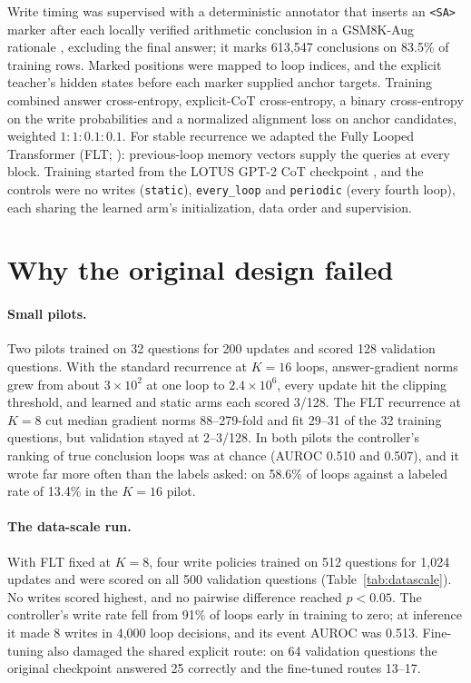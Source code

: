 \documentclass[11pt]{article}
\newcommand{\pol}[1]{\texttt{#1}}
\begin{document}
Write timing was supervised with a deterministic annotator that inserts an \texttt{<SA>} marker after each locally verified
arithmetic conclusion in a GSM8K-Aug rationale \citep{deng2023implicit}, excluding the final answer; it marks 613,547
conclusions on 83.5\% of training rows. Marked positions were mapped to loop indices, and the explicit teacher's hidden states
before each marker supplied anchor targets. Training combined answer cross-entropy, explicit-CoT cross-entropy, a binary
cross-entropy on the write probabilities and a normalized alignment loss on anchor candidates, weighted $1 : 1 : 0.1 : 0.1$.
For stable recurrence we adapted the Fully Looped Transformer (FLT; \citealp{fu2026flt}): previous-loop memory vectors supply
the queries at every block. Training started from the LOTUS GPT-2 CoT checkpoint \citep{fan2026lotus}, and the controls were
no writes (\pol{static}), \pol{every\_loop} and \pol{periodic} (every fourth loop), each sharing the learned arm's
initialization, data order and supervision.

\section{Why the original design failed}
\label{sec:original-failure}

\paragraph{Small pilots.} Two pilots trained on 32 questions for 200 updates and scored 128 validation questions. With the
standard recurrence at $K = 16$ loops, answer-gradient norms grew from about $3 \times 10^2$ at one loop to $2.4 \times
10^6$, every update hit the clipping threshold, and learned and static arms each scored 3/128. The FLT recurrence at $K = 8$
cut median gradient norms 88--279-fold and fit 29--31 of the 32 training questions, but validation stayed at 2--3/128. In
both pilots the controller's ranking of true conclusion loops was at chance (AUROC 0.510 and 0.507), and it wrote far more
often than the labels asked: on 58.6\% of loops against a labeled rate of 13.4\% in the $K = 16$ pilot.

\paragraph{The data-scale run.} With FLT fixed at $K = 8$, four write policies trained on 512 questions for 1,024 updates and
were scored on all 500 validation questions (Table~\ref{tab:datascale}). No writes scored highest, and no pairwise difference
reached $p < 0.05$. The controller's write rate fell from 91\% of loops early in training to zero; at inference it made 8
writes in 4,000 loop decisions, and its event AUROC was 0.513. Fine-tuning also damaged the shared explicit route: on 64
validation questions the original checkpoint answered 25 correctly and the fine-tuned routes 13--17.
\end{document}
